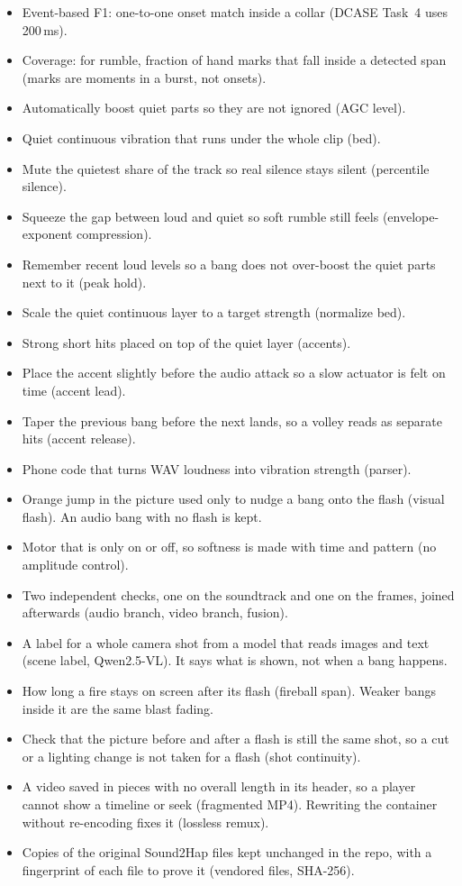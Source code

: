 \documentclass[11pt,a4paper]{article}
\begin{document}
\begin{itemize}[leftmargin=*,itemsep=3pt]
  \item Event-based F1: one-to-one onset match inside a collar (DCASE Task~4 uses 200\,ms).
  \item Coverage: for rumble, fraction of hand marks that fall inside a detected span (marks are moments in a burst, not onsets).
  \item Automatically boost quiet parts so they are not ignored (AGC level).
  \item Quiet continuous vibration that runs under the whole clip (bed).
  \item Mute the quietest share of the track so real silence stays silent (percentile silence).
  \item Squeeze the gap between loud and quiet so soft rumble still feels (envelope-exponent compression).
  \item Remember recent loud levels so a bang does not over-boost the quiet parts next to it (peak hold).
  \item Scale the quiet continuous layer to a target strength (normalize bed).
  \item Strong short hits placed on top of the quiet layer (accents).
  \item Place the accent slightly before the audio attack so a slow actuator is felt on time (accent lead).
  \item Taper the previous bang before the next lands, so a volley reads as separate hits (accent release).
  \item Phone code that turns WAV loudness into vibration strength (parser).
  \item Orange jump in the picture used only to nudge a bang onto the flash (visual flash). An audio bang with no flash is kept.
  \item Motor that is only on or off, so softness is made with time and pattern (no amplitude control).
  \item Two independent checks, one on the soundtrack and one on the frames, joined afterwards (audio branch, video branch, fusion).
  \item A label for a whole camera shot from a model that reads images and text (scene label, Qwen2.5-VL). It says what is shown, not when a bang happens.
  \item How long a fire stays on screen after its flash (fireball span). Weaker bangs inside it are the same blast fading.
  \item Check that the picture before and after a flash is still the same shot, so a cut or a lighting change is not taken for a flash (shot continuity).
  \item A video saved in pieces with no overall length in its header, so a player cannot show a timeline or seek (fragmented MP4). Rewriting the container without re-encoding fixes it (lossless remux).
  \item Copies of the original Sound2Hap files kept unchanged in the repo, with a fingerprint of each file to prove it (vendored files, SHA-256).
\end{itemize}
\end{document}
